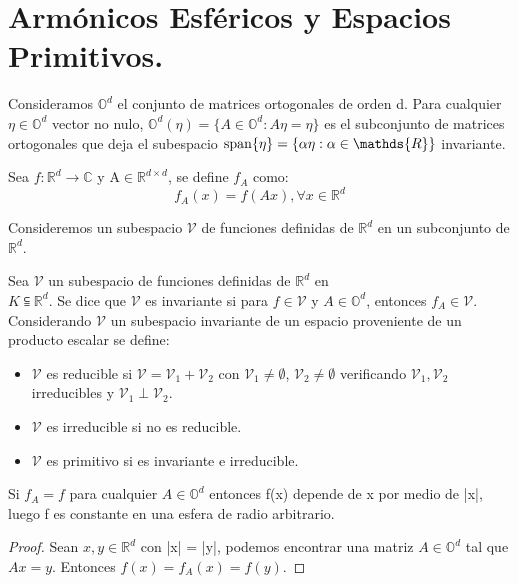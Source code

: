 \section{Armónicos Esféricos y Espacios Primitivos.}
Consideramos $\mathds{O}^d$ el conjunto de matrices ortogonales de orden d. Para cualquier $\eta \in \mathds{O}^d$ vector no nulo, $\mathds{O}^d (\eta)= \{ A \in \mathds{O}^d : A\eta = \eta \} $ es el subconjunto de matrices ortogonales que deja el subespacio $\spn\{\eta\} = \{\alpha \eta : \alpha \in \mathds{R}\}$ invariante.

\begin{defn}
	Sea $f:\mathds{R}^d \to \mathds{C}$ y A$ \in \mathds{R}^{d \times d}$, se define $f_A$ como:
	$$
	f_A(x)=f(Ax)   , \forall x \in \mathds{R}^d
	$$
\end{defn}

Consideremos un subespacio $\mathcal{V}$ de funciones definidas de $\mathds{R}^d$ en un subconjunto de $\mathds{R}^d$.
\begin{defn}
	Sea $\mathcal{V}$ un subespacio de funciones definidas de $\mathds{R}^d$ en\\ $K \subseteqq \mathds{R}^d$. Se dice que $\mathcal{V}$ es invariante si para  $f \in \mathcal{V}$ y  $A\in\mathds{O}^d$, entonces  $f_A \in \mathcal{V}$.
	Considerando $\mathcal{V}$ un subespacio invariante de un espacio proveniente de un producto escalar se define:
	\begin{itemize}
		\item $\mathcal{V}$ es reducible si  $\mathcal{V} = \mathcal{V}_1 + \mathcal{V}_2$ con $\mathcal{V}_1 \not= \emptyset$, $\mathcal{V}_2 \not= \emptyset$ verificando $\mathcal{V}_1,\mathcal{V}_2$ irreducibles y $\mathcal{V}_1 \perp \mathcal{V}_2$.
		\item $\mathcal{V}$ es irreducible si no es reducible.
		\item $\mathcal{V}$ es primitivo si es invariante e irreducible.
	\end{itemize}
\end{defn}

\begin{prop}\label{prop:1}
Si $f_A=f$ para cualquier $A\in \mathds{O}^d$ entonces f(x) depende de x por medio de |x|, luego f es constante en una esfera de radio arbitrario.
\end{prop}

\begin{proof} Sean $x,y \in \mathds{R}^d$ con |x| = |y|, podemos encontrar una matriz $A \in \mathds{O}^d$ tal que $Ax = y$. Entonces $f(x)=f_A(x)=f(y)$.
	
\end{proof}

